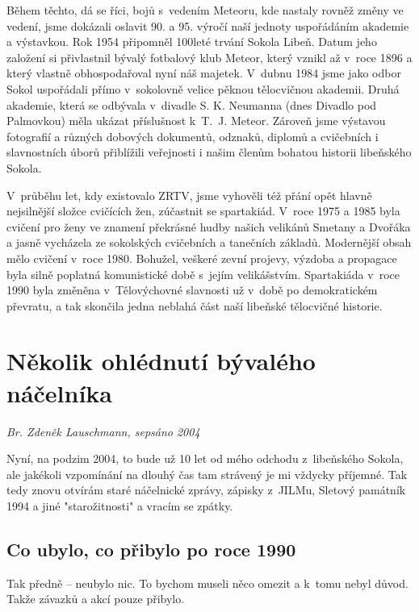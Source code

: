 \documentclass[a5paper, 11pt, twoside]{article}
\begin{document}
Během těchto, dá se říci, bojů s~vedením Meteoru, kde nastaly rovněž
změny ve vedení, jsme dokázali oslavit 90. a 95. výročí naší jednoty
uspořádáním akademie a výstavkou. Rok 1954 připomněl 100leté trvání
Sokola Libeň. Datum jeho založení si přivlastnil bývalý fotbalový klub
Meteor, který vznikl až v~roce 1896 a který vlastně obhospodařoval nyní
náš majetek. V~dubnu 1984 jsme jako odbor Sokol uspořádali přímo
v~sokolovně velice pěknou tělocvičnou akademii. Druhá akademie, která se
odbývala v~divadle S. K. Neumanna (dnes Divadlo pod Palmovkou) měla
ukázat příslušnost k~T.~J. Meteor. Zároveň jsme výstavou fotografií a
různých dobových dokumentů, odznaků, diplomů a cvičebních i slavnostních
úborů přiblížili veřejnosti i našim členům bohatou historii libeňského
Sokola.

V~průběhu let, kdy existovalo ZRTV, jsme vyhověli též přání opět hlavně
nejsilnější složce cvičících žen, zúčastnit se spartakiád. V~roce 1975 a
1985 byla cvičení pro ženy ve znamení překrásné hudby našich velikánů
Smetany a Dvořáka a jasně vycházela ze sokolských cvičebních a tanečních
základů. Modernější obsah mělo cvičení v~roce 1980. Bohužel, veškeré
zevní projevy, výzdoba a propagace byla silně poplatná komunistické době
s~jejím velikášstvím. Spartakiáda v~roce 1990 byla změněna
v~Tělovýchovné slavnosti už v~době po demokratickém převratu, a tak
skončila jedna neblahá část naší libeňské tělocvičné historie.

\section{Několik ohlédnutí bývalého
náčelníka}
\begin{center}
  \textit{Br. Zdeněk Lauschmann, sepsáno 2004}
\end{center}

\noindent
Nyní, na podzim 2004, to bude už 10 let od mého odchodu z~libeňského
Sokola, ale jakékoli vzpomínání na dlouhý čas tam strávený je mi vždycky
příjemné. Tak tedy znovu otvírám staré náčelnické zprávy, zápisky
z~JILMu, Sletový památník 1994 a jiné "starožitnosti" a vracím se zpátky.

\subsection{Co ubylo, co přibylo po roce
1990}

Tak předně -- neubylo nic. To bychom museli něco omezit a k~tomu nebyl
důvod. Takže závazků a akcí pouze přibylo.
\end{document}
